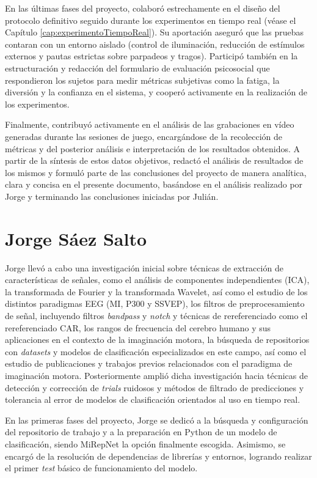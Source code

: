 En las últimas fases del proyecto, colaboró estrechamente en el diseño del protocolo definitivo seguido durante los experimentos en tiempo real (véase el Capítulo \ref{cap:experimentoTiempoReal}). Su aportación aseguró que las pruebas contaran con un entorno aislado (control de iluminación, reducción de estímulos externos y pautas estrictas sobre parpadeos y tragos). Participó también en la estructuración y redacción del formulario de evaluación psicosocial que respondieron los sujetos para medir métricas subjetivas como la fatiga, la diversión y la confianza en el sistema, y cooperó activamente en la realización de los experimentos.

Finalmente, contribuyó activamente en el análisis de las grabaciones en vídeo generadas durante las sesiones de juego, encargándose de la recolección de métricas y del posterior análisis e interpretación de los resultados obtenidos. A partir de la síntesis de estos datos objetivos, redactó el análisis de resultados de los mismos y formuló parte de las conclusiones del proyecto de manera analítica, clara y concisa en el presente documento, basándose en el análisis realizado por Jorge y terminando las conclusiones iniciadas por Julián.

\section*{Jorge Sáez Salto}
Jorge llevó a cabo una investigación inicial sobre técnicas de extracción de 
características de señales, como el análisis de componentes independientes (ICA), 
la transformada de Fourier y la transformada Wavelet, así como el estudio de los 
distintos paradigmas EEG (MI, P300 y SSVEP), los filtros de preprocesamiento de 
señal, incluyendo filtros \textit{bandpass} y \textit{notch} y técnicas de 
rereferenciado como el rereferenciado CAR, los rangos de frecuencia del cerebro 
humano y sus aplicaciones en el contexto de la imaginación motora, la búsqueda 
de repositorios con \textit{datasets} y modelos de clasificación especializados 
en este campo, así como el estudio de publicaciones y trabajos previos 
relacionados con el paradigma de imaginación motora. Posteriormente amplió dicha 
investigación hacia técnicas de detección y corrección de \textit{trials} 
ruidosos y métodos de filtrado de predicciones y tolerancia al error de modelos 
de clasificación orientados al uso en tiempo real.

En las primeras fases del proyecto, Jorge se dedicó a la búsqueda y configuración 
del repositorio de trabajo y a la preparación en Python de un modelo de 
clasificación, siendo MiRepNet la opción finalmente escogida. Asimismo, se encargó 
de la resolución de dependencias de librerías y entornos, logrando realizar el 
primer \textit{test} básico de funcionamiento del modelo.

